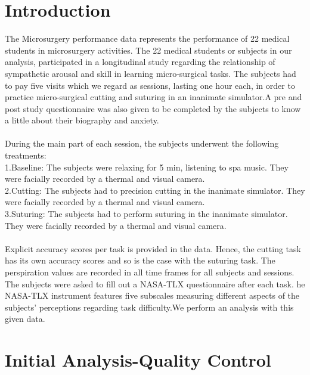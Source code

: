 \documentclass[12pt,epsf]{report}
\begin{document}
\section*{Introduction}
{The Microsurgery performance data represents the performance of 22 medical students in microsurgery activities. The 22 medical students or subjects in our analysis, participated in a longitudinal study regarding the relationship of sympathetic arousal and skill in learning micro-surgical tasks. The subjects had to pay five visits which we regard as sessions, lasting one hour each, in order to practice micro-surgical cutting and suturing in an inanimate simulator.A pre and post study questionnaire was also given to be completed by the subjects to know a little about their biography and anxiety.\\
\\
During the main part of each session, the subjects underwent the following treatments:\\
1.Baseline: The subjects were relaxing for 5 min, listening to spa music. They were facially recorded by a thermal and visual camera.\\
2.Cutting: The subjects had to precision cutting in the inanimate simulator. They were facially recorded by a thermal and visual camera.\\
3.Suturing: The subjects had to perform suturing in the inanimate simulator. They were facially recorded by a thermal and visual camera.\\
\\
Explicit accuracy scores per task is provided in the data. Hence, the cutting task has its own accuracy scores and so is the case with the suturing task. The perspiration values are recorded in all time frames for all subjects and sessions. The subjects were asked to fill out a  NASA-TLX questionnaire after each task. he NASA-TLX instrument features five subscales measuring different aspects of the subjects' perceptions regarding task difficulty.We perform an analysis with this given data.\\   }

\newpage
\section*{Initial Analysis-Quality Control}
\end{document}
